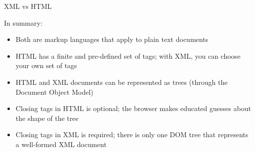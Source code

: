 
\begin{frame}{XML vs HTML}

In summary:

\begin{itemize}[-]
\item Both are markup languages that apply to plain text documents
\item HTML has a finite and pre-defined set of tags; with XML, you can choose your own set of tags
\item HTML and XML documents can be represented as trees (through the Document Object Model)
\item Closing tags in HTML is optional; the browser makes educated guesses about the shape of the tree
\item Closing tags in XML is required; there is only one DOM tree that represents a well-formed XML document
\end{itemize}
\end{frame}


